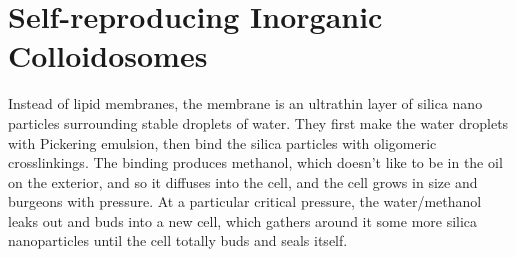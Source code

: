 \documentclass[11pt]{amsart}
\begin{document}
\section{Self-reproducing Inorganic Colloidosomes}
Instead of lipid membranes, the membrane is an ultrathin layer of silica nano particles surrounding stable droplets of water. They first make the water droplets with Pickering emulsion, then bind the silica particles with oligomeric crosslinkings. The binding produces methanol, which doesn't like to be in the oil on the exterior, and so it diffuses into the cell, and the cell grows in size and burgeons with pressure. At a particular critical pressure, the water/methanol leaks out and buds into a new cell, which gathers around it some more silica nanoparticles until the cell totally buds and seals itself.
\end{document}
